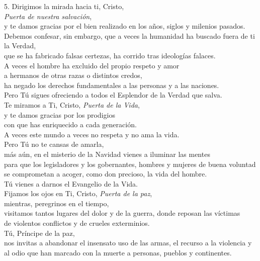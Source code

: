 5. Dirigimos la mirada hacia ti, Cristo,\emph{\\
	Puerta de nuestra salvación},\\
y te damos gracias por el bien realizado en los años, siglos y milenios
pasados.\\
Debemos confesar, sin embargo, que a veces la humanidad ha buscado fuera
de ti la Verdad,\\
que se ha fabricado falsas certezas, ha corrido tras ideologías
falaces.\\
A veces el hombre ha excluido del propio respeto y amor\\
a hermanos de otras razas o distintos credos,\\
ha negado los derechos fundamentales a las personas y a las naciones.\\
Pero Tú sigues ofreciendo a todos el Esplendor de la Verdad que salva.\\
Te miramos a Ti, Cristo, \emph{Puerta de la Vida},\\
y te damos gracias por los prodigios\\
con que has enriquecido a cada generación.\\
A veces este mundo a veces no respeta y no ama la vida.\\
Pero Tú no te cansas de amarla,\\
más aún, en el misterio de la Navidad vienes a iluminar las mentes\\
para que los legisladores y los gobernantes, hombres y mujeres de buena
voluntad se comprometan a acoger, como don precioso, la vida del
hombre.\\
Tú vienes a darnos el Evangelio de la Vida.\\
Fijamos los ojos en Ti, Cristo, \emph{Puerta de la paz},\\
mientras, peregrinos en el tiempo,\\
visitamos tantos lugares del dolor y de la guerra, donde reposan las
víctimas\\
de violentos conflictos y de crueles exterminios.\\
Tú, Príncipe de la paz,\\
nos invitas a abandonar el insensato uso de las armas, el recurso a la
violencia y al odio que han marcado con la muerte a personas, pueblos y
continentes.

